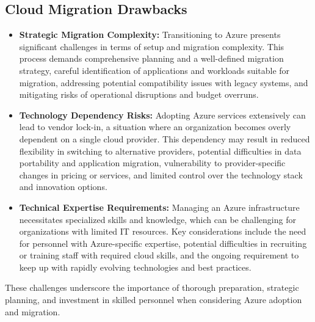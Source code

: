 \documentclass{llncs}
\begin{document}
\subsection{Cloud Migration Drawbacks}
\begin{itemize}

    \item \textbf{Strategic Migration Complexity: }Transitioning to Azure presents significant challenges in terms of setup and migration complexity. This process demands comprehensive planning and a well-defined migration strategy, careful identification of applications and workloads suitable for migration, addressing potential compatibility issues with legacy systems, and mitigating risks of operational disruptions and budget overruns.

    \item \textbf{Technology Dependency Risks: }
          Adopting Azure services extensively can lead to vendor lock-in, a situation where an organization becomes overly dependent on a single cloud provider. This dependency may result in reduced flexibility in switching to alternative providers, potential difficulties in data portability and application migration, vulnerability to provider-specific changes in pricing or services, and limited control over the technology stack and innovation options.

    \item \textbf{Technical Expertise Requirements: }
          Managing an Azure infrastructure necessitates specialized skills and knowledge, which can be challenging for organizations with limited IT resources. Key considerations include the need for personnel with Azure-specific expertise, potential difficulties in recruiting or training staff with required cloud skills, and the ongoing requirement to keep up with rapidly evolving technologies and best practices.
\end{itemize}
These challenges underscore the importance of thorough preparation, strategic planning, and investment in skilled personnel when considering Azure adoption and migration.
\end{document}
